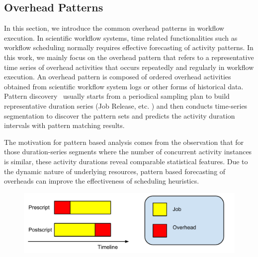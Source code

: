 

\subsection{Overhead Patterns}

In this section, we introduce the common overhead patterns in workflow execution. 
In scientific workflow systems, time related functionalities such as workflow scheduling normally requires effective forecasting of activity patterns. In this work, we mainly focus on the overhead pattern that refers to a representative time series of overhead activities that occurs repeatedly and regularly in workflow execution. An overhead pattern is composed of ordered overhead activities obtained from scientific workflow system logs or other forms of historical data. 
Pattern discovery~\cite{Liu2008} usually starts from a periodical sampling plan to build representative duration series (Job Release, etc. ) and then conducts time-series segmentation to discover the pattern sets and predicts the activity duration intervals with pattern matching results. 


The motivation for pattern based analysis comes from the observation that for those duration-series segments where the number of concurrent activity instances is similar, these activity durations reveal comparable statistical features. Due to the dynamic nature of underlying resources, pattern based forecasting of overheads can improve the effectiveness of scheduling heuristics. 

\begin{figure}[htb]
\centering
 \includegraphics[width=1\linewidth]{figure/adherence.pdf}
  \label{fig:adhere}
  \vspace{-10pt}
\end{figure}

